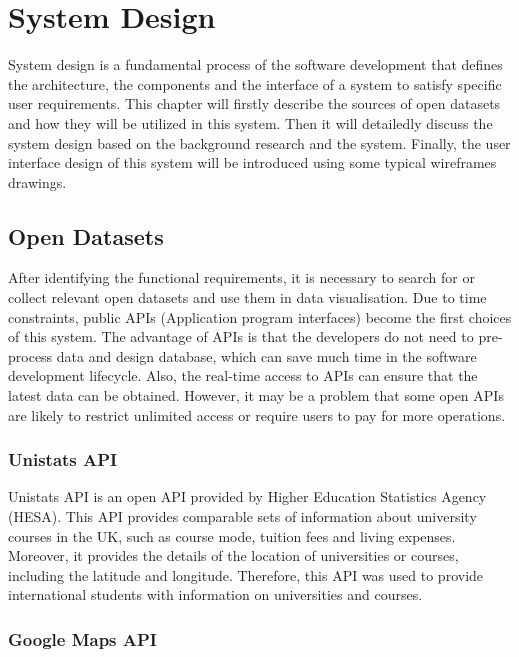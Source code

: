 
\chapter{System Design} \label{Chapter:System Design}

System design is a fundamental process of the software development that defines the architecture, the components and the interface of a system to satisfy specific user requirements. This chapter will firstly describe the sources of open datasets and how they will be utilized in this system. Then it will detailedly discuss the system design based on the background research and the system. Finally, the user interface design of this system will be introduced using some typical wireframes drawings.

\section{Open Datasets}
After identifying the functional requirements, it is necessary to search for or collect relevant open datasets and use them in data visualisation. Due to time constraints, public APIs (Application program interfaces) become the first choices of this system. The advantage of APIs is that the developers do not need to pre-process data and design database, which can save much time in the software development lifecycle. Also, the real-time access to APIs can ensure that the latest data can be obtained. However, it may be a problem that some open APIs are likely to restrict unlimited access or require users to pay for more operations.

\subsection{Unistats API}

Unistats API is an open API provided by Higher Education Statistics Agency (HESA). This API provides comparable sets of information about university courses in the UK, such as course mode, tuition fees and living expenses. Moreover, it provides the details of the location of universities or courses, including the latitude and longitude. Therefore, this API was used to provide international students with information on universities and courses.


\subsection{Google Maps API
}

